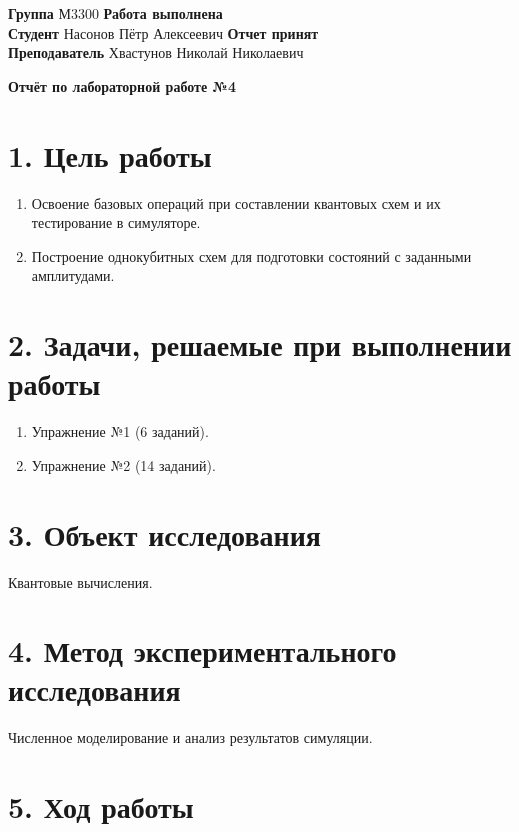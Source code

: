 \documentclass[10pt]{article}
\begin{document}
\textbf{Группа} М3300 \hfill \textbf{Работа выполнена} \underline{\hspace{4cm}} \\[0.5cm]
\textbf{Студент} Насонов Пётр Алексеевич \hfill \textbf{Отчет принят} \underline{\hspace{4cm}} \\[0.5cm]
\textbf{Преподаватель} Хвастунов Николай Николаевич \hfill \\

\begin{center}
    {\LARGE \textbf{Отчёт по лабораторной работе №4}}
\end{center}

\section*{1. Цель работы}
\begin{enumerate}
    \item Освоение базовых операций при составлении квантовых схем и их тестирование в симуляторе.
    \item Построение однокубитных схем для подготовки состояний с заданными амплитудами.
\end{enumerate}

\section*{2. Задачи, решаемые при выполнении работы}
\begin{enumerate}
    \item Упражнение №1 (6 заданий).
    \item Упражнение №2 (14 заданий).
\end{enumerate}

\section*{3. Объект исследования}
Квантовые вычисления.

\section*{4. Метод экспериментального исследования}
Численное моделирование и анализ результатов симуляции.

\section*{5. Ход работы}
\end{document}
